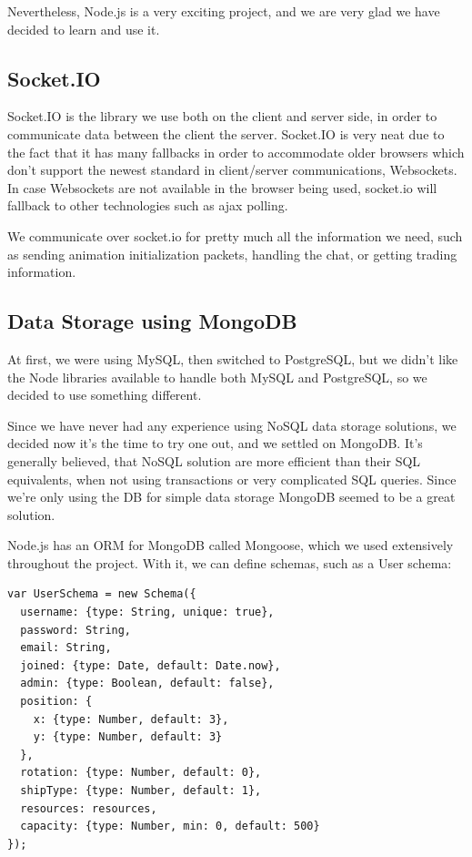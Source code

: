 \documentclass[a4paper,11pt]{article}
\begin{document}
			Nevertheless, Node.js is a very exciting project, and we are very glad we have decided to learn and use it.		
		
		\subsection{Socket.IO}
		
			Socket.IO is the library we use both on the client and server side, in order to communicate data between the client the server. Socket.IO is very neat due to the fact that it has many fallbacks in order to accommodate older browsers which don't support the newest standard in client/server communications, Websockets. In case Websockets are not available in the browser being used, socket.io will fallback to other technologies such as ajax polling.
		
			We communicate over socket.io for pretty much all the information we need, such as sending animation initialization packets, handling the chat, or getting trading information.
		
		\subsection{Data Storage using MongoDB}
			At first, we were using MySQL, then switched to PostgreSQL, but we didn't like the Node libraries available to handle both MySQL and PostgreSQL, so we decided to use something different.
			 
			Since we have never had any experience using NoSQL data storage solutions, we decided now it's the time to try one out, and we settled on MongoDB. It's generally believed, that NoSQL solution are more efficient than their SQL equivalents, when not using transactions or very complicated SQL queries. Since we're only using the DB for simple data storage MongoDB seemed to be a great solution.
			
			Node.js has an ORM for MongoDB called Mongoose, which we used extensively throughout the project. With it, we can define schemas, such as a User schema:
			
			\begin{verbatim}
var UserSchema = new Schema({
  username: {type: String, unique: true},
  password: String,
  email: String,
  joined: {type: Date, default: Date.now},
  admin: {type: Boolean, default: false},
  position: {
    x: {type: Number, default: 3},
    y: {type: Number, default: 3}
  },
  rotation: {type: Number, default: 0},
  shipType: {type: Number, default: 1},
  resources: resources,
  capacity: {type: Number, min: 0, default: 500}
});
			\end{verbatim}
		
\end{document}
